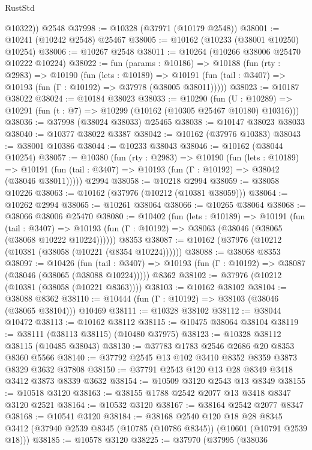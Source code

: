 \begin{lexlean}{RustStd}
\begin{coremodule}
        @10322))
    @2548
@37998 := @10328 (@37971 (@10179 @2548))
@38001 := @10241 (@10242 @2548) @25467
@38005 := @10162 (@10233 (@38001 @10250) @10254)
@38006 := @10267 @2548
@38011 := @10264 (@10266 @38006 @25470 @10222 @10224)
@38022 := fun (params : @10186) =>
  @10188
    (fun (rty : @2983) =>
    @10190
      (fun (lets : @10189) =>
      @10191 (fun (tail : @3407) => @10193 (fun (Γ : @10192) => @37978 (@38005 @38011)))))
@38023 := @10187 @38022
@38024 := @10184 @38023
@38033 := @10290
    (fun (U : @10289) => @10291 (fun (t : @7) => @10299 (@10162 (@10305 @25467 @10180) @10316)))
@38036 := @37998 (@38024 @38033) @25465
@38038 := @10147 @38023 @38033
@38040 := @10377 @38022 @3387
@38042 := @10162 (@37976 @10383)
@38043 := @38001 @10386
@38044 := @10233 @38043
@38046 := @10162 (@38044 @10254)
@38057 := @10380
    (fun (rty : @2983) =>
    @10190
      (fun (lets : @10189) =>
      @10191 (fun (tail : @3407) => @10193 (fun (Γ : @10192) => @38042 (@38046 @38011)))))
    @2994
@38058 := @10218 @2994
@38059 := @38058 @10226
@38063 := @10162 (@37976 (@10212 (@10381 @38059)))
@38064 := @10262 @2994
@38065 := @10261 @38064
@38066 := @10265 @38064
@38068 := @38066 @38006 @25470
@38080 := @10402
    (fun (lets : @10189) =>
    @10191
      (fun (tail : @3407) =>
      @10193 (fun (Γ : @10192) => @38063 (@38046 (@38065 (@38068 @10222 @10224))))))
    @8353
@38087 := @10162 (@37976 (@10212 (@10381 (@38058 (@10221 (@8354 @10224))))))
@38088 := @38068 @8353
@38097 := @10426
    (fun (tail : @3407) => @10193 (fun (Γ : @10192) => @38087 (@38046 (@38065 (@38088 @10224)))))
    @8362
@38102 := @37976 (@10212 (@10381 (@38058 (@10221 @8363))))
@38103 := @10162 @38102
@38104 := @38088 @8362
@38110 := @10444 (fun (Γ : @10192) => @38103 (@38046 (@38065 @38104))) @10469
@38111 := @10328 @38102
@38112 := @38044 @10472
@38113 := @10162 @38112
@38115 := @10475 @38064 @38104
@38119 := @38111 (@38113 @38115) (@10480 @37975)
@38123 := @10328 @38112 @38115 (@10485 @38043)
@38130 := @37783 @1783 @2546 @2686 @20 @8353 @8360 @5566
@38140 := @37792 @2545 @13 @102 @3410 @8352 @8359 @3873 @8329 @3632 @37808
@38150 := @37791 @2543 @120 @13 @28 @8349 @3418 @3412 @3873 @8339 @3632
@38154 := @10509 @3120 @2543 @13 @8349
@38155 := @10518 @3120
@38163 := @38155 @1788 @2542 @2077 @13 @3418 @8347 @3120 @2521
@38164 := @10532 @3120
@38167 := @38164 @2542 @2077 @8347
@38168 := @10541 @3120
@38184 := @38168
    @2540
    @120
    @18
    @28
    @8345
    @3412
    (@37940 @2539 @8345 (@10785 (@10786 @8345)) (@10601 (@10791 @2539 @18)))
@38185 := @10578 @3120
@38225 := @37970
    (@37995
      (@38036

\end{coremodule}
\end{lexlean}
